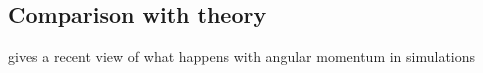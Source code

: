 \subsection{Comparison with theory}

\cite{2016arXiv160405842K} gives a recent view of what happens with angular momentum in simulations